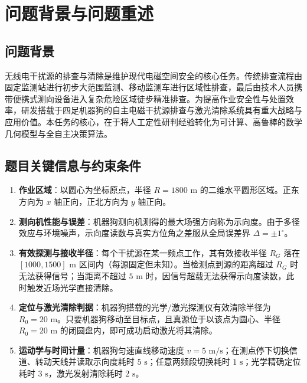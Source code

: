 \documentclass[12pt,a4paper,UTF8]{ctexart}
\begin{document}
\begin{abstract}
\textbf{针对问题四（定向干扰源可见性与外圈补盲协同策略）}：引入定向辐射半平面覆盖模型，利用凸集分离定理证明：\textbf{任意朝向定向源保底被检出的充要条件是干扰源落在可见站点集的凸包内}。指出域内布点在边界必然产生朝外漏检缺陷，推导外圈补盲站点的半径与点数相容区间，增设 14 个域外补盲站点（半径 $1860\text{ m}$）使保底检出率提升至 100\%。建立基于覆盖凸性的沿示向度射线二分逼近算法，升级最小外接圆为“必命中”判据。在官方模拟器三次正式测试中，\textbf{干扰源清除率再次达到 100\%}。

\vspace{3mm}
\noindent \textbf{关键词}：移动机器人；半平面交；旋转卡壳；最小外接圆；覆盖完备性；凸包可见性；旅行商问题（2-opt）；状态机调度
\end{abstract}

\newpage
\setcounter{page}{1}

\section{问题背景与问题重述}
\subsection{问题背景}
无线电干扰源的排查与清除是维护现代电磁空间安全的核心任务。传统排查流程由固定监测站进行初步大范围监测、移动监测车进行区域性排查，最后由技术人员携带便携式测向设备进入复杂危险区域徒步精准排查。为提高作业安全性与处置效率，研发搭载于四足机器狗的自主电磁干扰源排查与激光清除系统具有重大战略与应用价值。本任务的核心，在于将人工定性研判经验转化为可计算、高鲁棒的数学几何模型与全自主决策算法。

\subsection{题目关键信息与约束条件}
\begin{enumerate}
    \item \textbf{作业区域}：以圆心为坐标原点，半径 $R = 1800\text{ m}$ 的二维水平圆形区域。正东方向为 $x$ 轴正向，正北方向为 $y$ 轴正向。
    \item \textbf{测向机性能与误差}：机器狗测向机测得的最大场强方向称为示向度。由于多径效应与环境噪声，示向度读数与真实方位角之差服从全局误差界 $\Delta = \pm 1^\circ$。
    \item \textbf{有效探测与接收半径}：每个干扰源在某一频点工作，其有效接收半径 $R_G$ 落在 $[1000, 1500]\text{ m}$ 区间内（每源固定但未知）。当检测点到源的距离超过 $R_G$ 时无法获得信号；当距离不超过 $5\text{ m}$ 时，因信号超载无法获得示向度读数，此时触发近场光学直接清除。
    \item \textbf{定位与激光清除判据}：机器狗搭载的光学/激光探测仪有效清除半径为 $R_0 = 20\text{ m}$。只要机器狗移动至目标点，且真源位于以该点为圆心、半径 $R_0 = 20\text{ m}$ 的闭圆盘内，即可成功启动激光将其清除。
    \item \textbf{运动学与时间计量}：机器狗匀速直线移动速度 $v = 5\text{ m/s}$；在测点停下切换信道、转动天线并读取示向度耗时 $5\text{ s}$；任意两频段切换耗时 $1\text{ s}$；光学精确定位耗时 $3\text{ s}$，激光发射清除耗时 $2\text{ s}$。
\end{enumerate}
\end{document}
